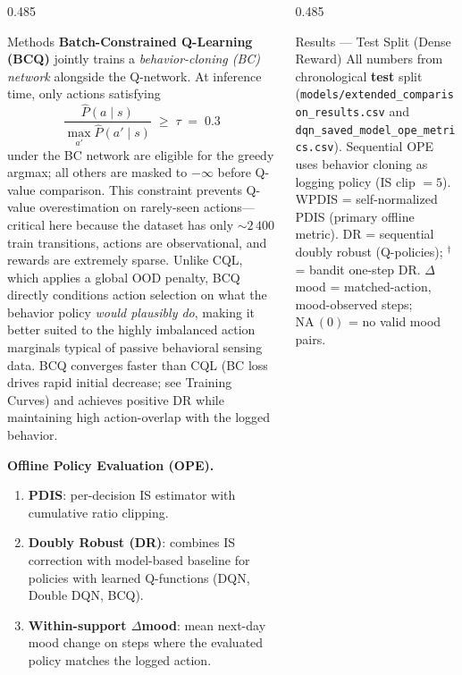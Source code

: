 \documentclass[final]{beamer}
\begin{document}
\begin{frame}[t]{}
\begin{columns}[T]
\begin{column}{0.485\linewidth}
\begin{block}{Methods}
\medskip
\textbf{Batch-Constrained Q-Learning (BCQ)} \citep{fujimoto2019bcq}
jointly trains a \emph{behavior-cloning (BC) network} alongside the Q-network.
At inference time, only actions satisfying
\[
  \frac{\hat{P}(a \mid s)}{\max_{a'}\hat{P}(a' \mid s)} \;\geq\; \tau \;=\; 0.3
\]
under the BC network are eligible for the greedy argmax; all others are masked
to $-\infty$ before Q-value comparison.
This constraint prevents Q-value overestimation on rarely-seen actions—critical
here because the dataset has only ${\sim}2\,400$ train transitions, actions are
observational, and rewards are extremely sparse.
Unlike CQL, which applies a global OOD penalty, BCQ directly conditions
action selection on what the behavior policy \emph{would plausibly do},
making it better suited to the highly imbalanced action marginals typical
of passive behavioral sensing data.
BCQ converges faster than CQL (BC loss drives rapid initial decrease;
see Training Curves) and achieves positive DR while maintaining high
action-overlap with the logged behavior.

\medskip
\textbf{Offline Policy Evaluation (OPE).}
\begin{enumerate}
  \item \textbf{PDIS}: per-decision IS estimator with cumulative ratio clipping.
  \item \textbf{Doubly Robust (DR)}: combines IS correction with model-based
        baseline for policies with learned Q-functions (DQN, Double DQN, BCQ).
  \item \textbf{Within-support $\Delta$mood}: mean next-day mood change on
        steps where the evaluated policy matches the logged action.
\end{enumerate}
\end{block}

\end{column}

\begin{column}{0.485\linewidth}

\begin{block}{Results --- Test Split (Dense Reward)}
\justifying
All numbers from chronological \textbf{test} split (\texttt{models/extended\_comparison\_results.csv}
and \texttt{dqn\_saved\_model\_ope\_metrics.csv}).
Sequential OPE uses behavior cloning as logging policy (IS clip $= 5$).
WPDIS = self-normalized PDIS (primary offline metric).
DR = sequential doubly robust (Q-policies); $^\dagger$ = bandit one-step DR.
$\Delta$mood = matched-action, mood-observed steps; $\mathrm{NA}\,(0)$ = no valid mood pairs.


\end{block}
\end{column}
\end{columns}
\end{frame}
\end{document}
